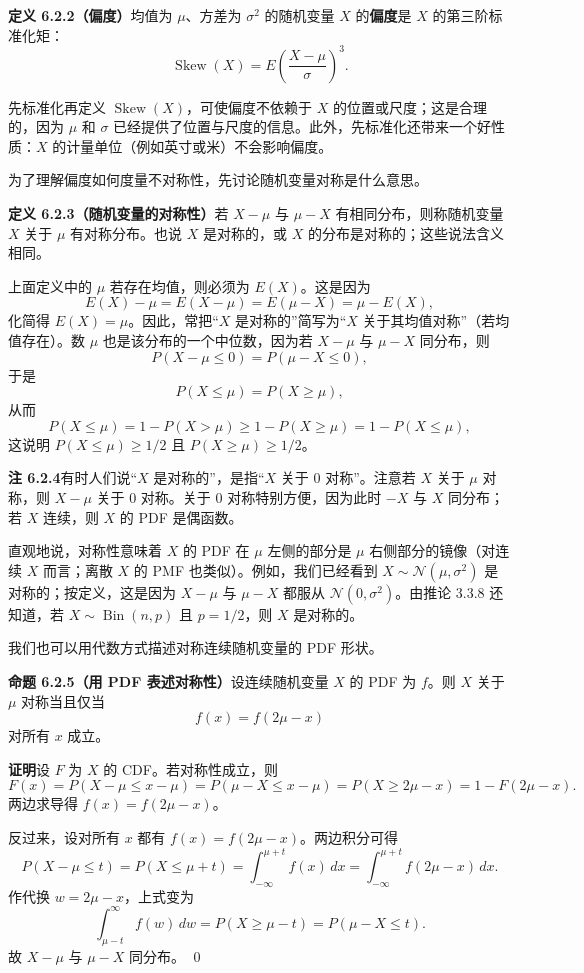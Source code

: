 \documentclass[UTF8, 12pt, fontset=fandol, oneside]{ctexart}
\begin{document}
\noindent\textbf{定义 6.2.2（偏度）}\quad 均值为 $\mu$、方差为 $\sigma^2$ 的随机变量 $X$ 的\textbf{偏度}是 $X$ 的第三阶标准化矩：
\[
  \operatorname{Skew}(X)
  =
  E\left(\frac{X-\mu}{\sigma}\right)^3.
\]

先标准化再定义 $\operatorname{Skew}(X)$，可使偏度不依赖于 $X$ 的位置或尺度；这是合理的，因为 $\mu$ 和 $\sigma$ 已经提供了位置与尺度的信息。此外，先标准化还带来一个好性质：$X$ 的计量单位（例如英寸或米）不会影响偏度。

为了理解偏度如何度量不对称性，先讨论随机变量对称是什么意思。

\noindent\textbf{定义 6.2.3（随机变量的对称性）}\quad 若 $X-\mu$ 与 $\mu-X$ 有相同分布，则称随机变量 $X$ 关于 $\mu$ 有对称分布。也说 $X$ 是对称的，或 $X$ 的分布是对称的；这些说法含义相同。

上面定义中的 $\mu$ 若存在均值，则必须为 $E(X)$。这是因为
\[
  E(X)-\mu=E(X-\mu)=E(\mu-X)=\mu-E(X),
\]
化简得 $E(X)=\mu$。因此，常把“$X$ 是对称的”简写为“$X$ 关于其均值对称”（若均值存在）。数 $\mu$ 也是该分布的一个中位数，因为若 $X-\mu$ 与 $\mu-X$ 同分布，则
\[
  P(X-\mu\le0)=P(\mu-X\le0),
\]
于是
\[
  P(X\le\mu)=P(X\ge\mu),
\]
从而
\[
  P(X\le\mu)=1-P(X>\mu)\ge1-P(X\ge\mu)=1-P(X\le\mu),
\]
这说明 $P(X\le\mu)\ge1/2$ 且 $P(X\ge\mu)\ge1/2$。

\noindent\textbf{注 6.2.4}\quad 有时人们说“$X$ 是对称的”，是指“$X$ 关于 $0$ 对称”。注意若 $X$ 关于 $\mu$ 对称，则 $X-\mu$ 关于 $0$ 对称。关于 $0$ 对称特别方便，因为此时 $-X$ 与 $X$ 同分布；若 $X$ 连续，则 $X$ 的 PDF 是偶函数。

直观地说，对称性意味着 $X$ 的 PDF 在 $\mu$ 左侧的部分是 $\mu$ 右侧部分的镜像（对连续 $X$ 而言；离散 $X$ 的 PMF 也类似）。例如，我们已经看到 $X\sim\mathcal{N}(\mu,\sigma^2)$ 是对称的；按定义，这是因为 $X-\mu$ 与 $\mu-X$ 都服从 $\mathcal{N}(0,\sigma^2)$。由推论 3.3.8 还知道，若 $X\sim\operatorname{Bin}(n,p)$ 且 $p=1/2$，则 $X$ 是对称的。

我们也可以用代数方式描述对称连续随机变量的 PDF 形状。

\noindent\textbf{命题 6.2.5（用 PDF 表述对称性）}\quad 设连续随机变量 $X$ 的 PDF 为 $f$。则 $X$ 关于 $\mu$ 对称当且仅当
\[
  f(x)=f(2\mu-x)
\]
对所有 $x$ 成立。

\noindent\textbf{证明}\quad 设 $F$ 为 $X$ 的 CDF。若对称性成立，则
\[
  F(x)=P(X-\mu\le x-\mu)
  =P(\mu-X\le x-\mu)
  =P(X\ge2\mu-x)=1-F(2\mu-x).
\]
两边求导得 $f(x)=f(2\mu-x)$。

反过来，设对所有 $x$ 都有 $f(x)=f(2\mu-x)$。两边积分可得
\[
  P(X-\mu\le t)=P(X\le\mu+t)
  =\int_{-\infty}^{\mu+t}f(x)\,dx
  =\int_{-\infty}^{\mu+t}f(2\mu-x)\,dx.
\]
作代换 $w=2\mu-x$，上式变为
\[
  \int_{\mu-t}^{\infty}f(w)\,dw
  =P(X\ge\mu-t)=P(\mu-X\le t).
\]
故 $X-\mu$ 与 $\mu-X$ 同分布。
\qed
\end{document}
